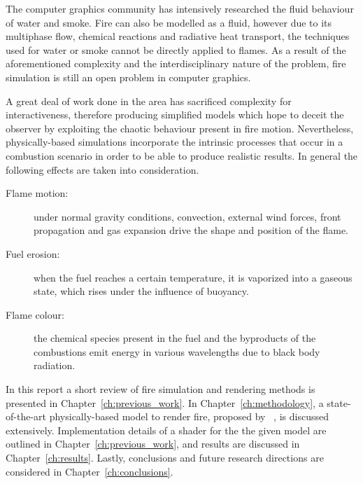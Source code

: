 The computer graphics community has intensively researched the fluid behaviour of water and smoke.
Fire can also be modelled as a fluid, however due to its multiphase flow, chemical reactions and radiative heat transport, the techniques used for water or smoke cannot be directly applied to flames.
As a result of the aforementioned complexity and the interdisciplinary nature of the problem, fire simulation is still an open problem in computer graphics.

A great deal of work done in the area has sacrificed complexity for interactiveness, therefore producing simplified models which hope to deceit the observer by exploiting the chaotic behaviour present in fire motion.
Nevertheless, physically-based simulations incorporate the intrinsic processes that occur in a combustion scenario in order to be able to produce realistic results.
In general the following effects are taken into consideration.

\begin{description}
\item[Flame motion:] under normal gravity conditions, convection, external wind forces, front propagation and gas expansion drive the shape and position of the flame. 
\item[Fuel erosion:] when the fuel reaches a certain temperature, it is vaporized into a gaseous state, which rises under the influence of buoyancy.
\item[Flame colour:] the chemical species present in the fuel and the byproducts of the combustions emit energy in various wavelengths due to black body radiation.
\end{description}

In this report a short review of fire simulation and rendering methods is presented in Chapter~\ref{ch:previous_work}.
In Chapter~\ref{ch:methodology}, a state-of-the-art physically-based model to render fire, proposed by ~\cite{Pegoraro:2006}, is discussed extensively.
Implementation details of a \MentalRay shader for the the given model are outlined in Chapter~\ref{ch:previous_work}, and results are discussed in Chapter~\ref{ch:results}.
Lastly, conclusions and future research directions are considered in Chapter~\ref{ch:conclusions}.